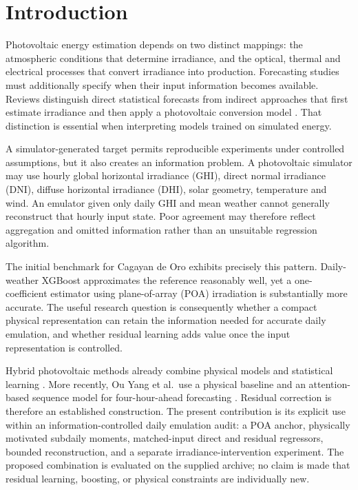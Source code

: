 \documentclass[11pt,a4paper]{article}
\begin{document}
\section{Introduction}
Photovoltaic energy estimation depends on two distinct mappings: the atmospheric conditions that determine irradiance, and the optical, thermal and electrical processes that convert irradiance into production. Forecasting studies must additionally specify when their input information becomes available. Reviews distinguish direct statistical forecasts from indirect approaches that first estimate irradiance and then apply a photovoltaic conversion model \cite{antonanzas2016}. That distinction is essential when interpreting models trained on simulated energy.

A simulator-generated target permits reproducible experiments under controlled assumptions, but it also creates an information problem. A photovoltaic simulator may use hourly global horizontal irradiance (GHI), direct normal irradiance (DNI), diffuse horizontal irradiance (DHI), solar geometry, temperature and wind. An emulator given only daily GHI and mean weather cannot generally reconstruct that hourly input state. Poor agreement may therefore reflect aggregation and omitted information rather than an unsuitable regression algorithm.

The initial benchmark for Cagayan de Oro exhibits precisely this pattern. Daily-weather XGBoost approximates the reference reasonably well, yet a one-coefficient estimator using plane-of-array (POA) irradiation is substantially more accurate. The useful research question is consequently whether a compact physical representation can retain the information needed for accurate daily emulation, and whether residual learning adds value once the input representation is controlled.

Hybrid photovoltaic methods already combine physical models and statistical learning \cite{santos2024}. More recently, Ou Yang et al.\ use a physical baseline and an attention-based sequence model for four-hour-ahead forecasting \cite{ouyang2026}. Residual correction is therefore an established construction. The present contribution is its explicit use within an information-controlled daily emulation audit: a POA anchor, physically motivated subdaily moments, matched-input direct and residual regressors, bounded reconstruction, and a separate irradiance-intervention experiment. The proposed combination is evaluated on the supplied archive; no claim is made that residual learning, boosting, or physical constraints are individually new.
\end{document}
